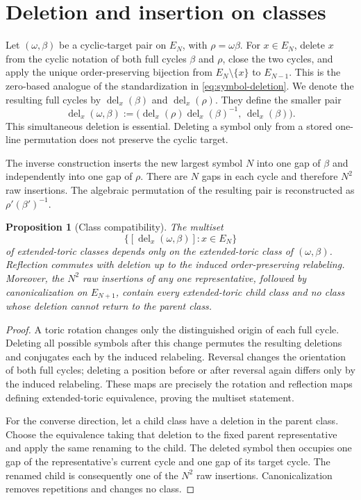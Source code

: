 \documentclass[11pt]{article}
\newtheorem{proposition}[theorem]{Proposition}
\theoremstyle{definition}
\theoremstyle{remark}
\newcommand{\Del}{\operatorname{del}}
\begin{document}
\section{Deletion and insertion on classes}\label{sec:classes}

Let $(\omega,\beta)$ be a cyclic-target pair on $E_N$, with
$\rho=\omega\beta$.  For $x\in E_N$, delete $x$ from the cyclic notation of
both full cycles $\beta$ and $\rho$, close the two cycles, and apply the
unique order-preserving bijection from $E_N\setminus\{x\}$ to $E_{N-1}$.
This is the zero-based analogue of the standardization in
\eqref{eq:symbol-deletion}.  We denote the resulting full cycles by
$\Del_x(\beta)$ and $\Del_x(\rho)$.  They define the smaller pair
\[
  \Del_x(\omega,\beta)
  :=\bigl(\Del_x(\rho)\Del_x(\beta)^{-1},\,\Del_x(\beta)\bigr).
\]
This simultaneous deletion is essential.  Deleting a symbol only from a
stored one-line permutation does not preserve the cyclic target.

The inverse construction inserts the new largest symbol $N$ into one gap of
$\beta$ and independently into one gap of $\rho$.  There are $N$ gaps in
each cycle and therefore $N^2$ raw insertions.  The algebraic permutation of
the resulting pair is reconstructed as $\rho'({\beta'})^{-1}$.

\begin{proposition}[Class compatibility]\label{prop:class-compatibility}
The multiset
\[
  \bigl\{[\Del_x(\omega,\beta)]:x\in E_N\bigr\}
\]
of extended-toric classes depends only on the extended-toric class of
$(\omega,\beta)$.  Reflection commutes with deletion up to the induced
order-preserving relabeling.  Moreover, the $N^2$ raw insertions of any one
representative, followed by canonicalization on $E_{N+1}$, contain every
extended-toric child class and no class whose deletion cannot return to the
parent class.
\end{proposition}

\begin{proof}
A toric rotation changes only the distinguished origin of each full cycle.
Deleting all possible symbols after this change permutes the resulting
deletions and conjugates each by the induced relabeling.  Reversal changes the
orientation of both full cycles; deleting a position before or after reversal
again differs only by the induced relabeling.  These maps are precisely the
rotation and reflection maps defining extended-toric equivalence, proving the
multiset statement.

For the converse direction, let a child class have a deletion in the parent
class.  Choose the equivalence taking that deletion to the fixed parent
representative and apply the same renaming to the child.  The deleted symbol
then occupies one gap of the representative's current cycle and one gap of
its target cycle.  The renamed child is consequently one of the $N^2$ raw
insertions.  Canonicalization removes repetitions and changes no class.
\end{proof}
\end{document}
